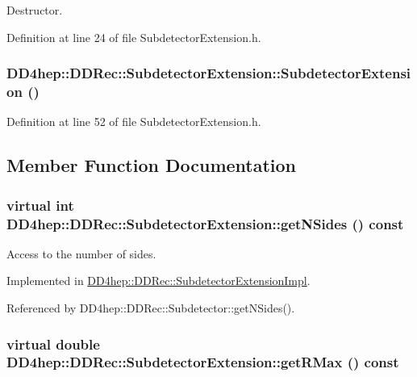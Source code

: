 Destructor. 

Definition at line 24 of file SubdetectorExtension.h.\hypertarget{class_d_d4hep_1_1_d_d_rec_1_1_subdetector_extension_ae04b137994a497fa056f2cfc84aa0eb9}{
\subsubsection[{SubdetectorExtension}]{\setlength{\rightskip}{0pt plus 5cm}DD4hep::DDRec::SubdetectorExtension::SubdetectorExtension ()}}
\label{class_d_d4hep_1_1_d_d_rec_1_1_subdetector_extension_ae04b137994a497fa056f2cfc84aa0eb9}


Definition at line 52 of file SubdetectorExtension.h.

\subsection{Member Function Documentation}
\hypertarget{class_d_d4hep_1_1_d_d_rec_1_1_subdetector_extension_a7bed401e919e8eaaf2dfdf8fe89a3697}{
\subsubsection[{getNSides}]{\setlength{\rightskip}{0pt plus 5cm}virtual int DD4hep::DDRec::SubdetectorExtension::getNSides () const}}
\label{class_d_d4hep_1_1_d_d_rec_1_1_subdetector_extension_a7bed401e919e8eaaf2dfdf8fe89a3697}


Access to the number of sides. 

Implemented in \hyperlink{class_d_d4hep_1_1_d_d_rec_1_1_subdetector_extension_impl_ac5bedd13a416dcf18730ce3eb23e2ee0}{DD4hep::DDRec::SubdetectorExtensionImpl}.

Referenced by DD4hep::DDRec::Subdetector::getNSides().\hypertarget{class_d_d4hep_1_1_d_d_rec_1_1_subdetector_extension_a6d7b6e1818a7ca5054279ea5d372b7f4}{
\subsubsection[{getRMax}]{\setlength{\rightskip}{0pt plus 5cm}virtual double DD4hep::DDRec::SubdetectorExtension::getRMax () const}}
\label{class_d_d4hep_1_1_d_d_rec_1_1_subdetector_extension_a6d7b6e1818a7ca5054279ea5d372b7f4}


